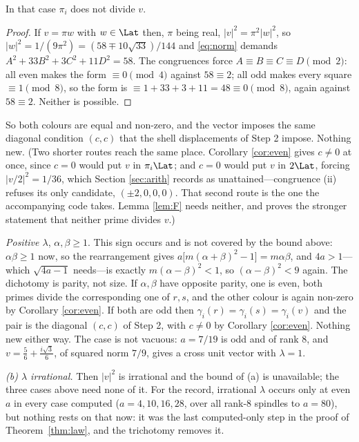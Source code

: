 \begin{lemma}\label{lem:F}
In that case $\pi_i$ does not divide $v$.
\end{lemma}

\begin{proof}
If $v = \pi w$ with $w \in \Lat$ then, $\pi$ being real,
$\lvert v \rvert^2 = \pi^2 \lvert w \rvert^2$, so
$\lvert w \rvert^2 = 1/(9\pi^2) = (58 \mp 10\sqrt{33})/144$ and \eqref{eq:norm}
demands $A^2 + 33B^2 + 3C^2 + 11D^2 = 58$. The congruences force
$A \equiv B \equiv C \equiv D \pmod 2$: all even makes the form $\equiv 0 \pmod 4$
against $58 \equiv 2$; all odd makes every square $\equiv 1 \pmod 8$, so the form
is $\equiv 1 + 33 + 3 + 11 = 48 \equiv 0 \pmod 8$, again against $58 \equiv 2$.
Neither is possible.
\end{proof}

So both colours are equal and non-zero, and the vector imposes the same diagonal
condition $(c,c)$ that the shell displacements of Step 2 impose. Nothing new.
(Two shorter routes reach the same place. Corollary \ref{cor:even} gives
$c \ne 0$ at once, since $c = 0$ would put $v$ in $\pi_i\Lat$; and $c = 0$ would put
$v$ in $2\Lat$, forcing $\lvert v/2 \rvert^2 = 1/36$, which Section
\ref{sec:arith} records as unattained---congruence (ii) refuses its only candidate,
$(\pm2,0,0,0)$. That second route is the one the accompanying code takes.
Lemma \ref{lem:F} needs neither, and proves the stronger statement that neither
prime divides $v$.)

\emph{Positive $\lambda$}, $\alpha,\beta \ge 1$. This sign occurs and is not
covered by the bound above: $\alpha\beta \ge 1$ now, so the rearrangement gives
$a\big[m(\alpha+\beta)^2 - 1\big] = m\alpha\beta$, and $4a > 1$---which
$\sqrt{4a-1}$ needs---is exactly $m(\alpha-\beta)^2 < 1$, so $(\alpha-\beta)^2 < 9$
again. The dichotomy is parity, not size. If $\alpha,\beta$ have opposite parity,
one is even, both primes divide the corresponding one of $r,s$, and the other
colour is again non-zero by Corollary \ref{cor:even}. If both are odd then
$\gamma_i(r) = \gamma_i(s) = \gamma_i(v)$ and the pair is the diagonal $(c,c)$ of
Step 2, with $c \ne 0$ by Corollary \ref{cor:even}. Nothing new either way. The
case is not vacuous: $a = 7/19$ is odd and of rank $8$, and
$v = \tfrac56 + \tfrac{i\sqrt3}{6}$, of squared norm $7/9$, gives a cross unit
vector with $\lambda = 1$.

\emph{(b) $\lambda$ irrational.} Then $\lvert v \rvert^2$ is irrational and the
bound of (a) is unavailable; the three cases above need none of it. For the record,
irrational $\lambda$ occurs only at even $a$ in every case computed
($a = 4, 10, 16, 28$, over all rank-$8$ spindles to $a = 80$), but nothing rests on
that now: it was the last computed-only step in the proof of
Theorem~\ref{thm:law}, and the trichotomy removes it.

